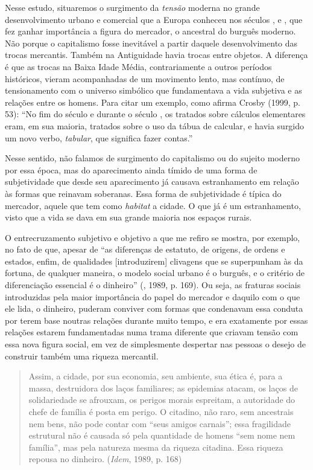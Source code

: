 Nesse estudo, situaremos o surgimento da \emph{tensão} moderna no grande
desenvolvimento urbano e comercial que a Europa conheceu nos séculos ,
 e , que fez ganhar importância a figura do mercador,
o ancestral do burguês moderno. Não porque o capitalismo fosse
inevitável a partir daquele desenvolvimento das trocas mercantis. Também
na Antiguidade havia trocas entre objetos. A diferença é que as trocas
na Baixa Idade Média, contrariamente a outros períodos
históricos, vieram acompanhadas de um movimento lento, mas contínuo, de
tensionamento com o universo simbólico que fundamentava a vida subjetiva
e as relações entre os homens. Para citar um exemplo, como afirma Crosby
(1999, p. 53): ``No fim do século  e durante o século , os tratados
sobre cálculos elementares eram, em sua maioria, tratados sobre o uso da
tábua de calcular, e havia surgido um novo verbo, \emph{tabular}, que
significa fazer contas.''

Nesse sentido, não falamos de surgimento do capitalismo ou do sujeito
moderno por essa época, mas do aparecimento ainda tímido de uma forma de
subjetividade que desde seu aparecimento já causava estranhamento em
relação às formas que reinavam soberanas. Essa forma de subjetividade é
típica do mercador, aquele que tem como \emph{habitat} a cidade.
O que já é um estranhamento, visto que a vida se dava em sua grande
maioria nos espaços rurais.

O entrecruzamento subjetivo e objetivo a que me refiro se mostra, por
exemplo, no fato de que, apesar de ``as diferenças de estatuto, de
origens, de ordens e estados, enfim, de qualidades [introduzirem]
clivagens que se superpunham às da fortuna, de qualquer maneira, o
modelo social urbano é o burguês, e o critério de diferenciação
essencial é o dinheiro'' (, 1989, p. 169). Ou
seja, as fraturas sociais introduzidas pela maior importância do papel
do mercador e daquilo com o que ele lida, o dinheiro, puderam conviver
com formas que condenavam essa conduta por terem base noutras relações
durante muito tempo, e era exatamente por essas relações estarem
fundamentadas numa trama diferente que criavam tensão com essa nova
figura social, em vez de simplesmente despertar nas pessoas o desejo de
construir também uma riqueza mercantil.

\begin{quote}
Assim, a cidade, por sua economia, seu ambiente, sua ética é, para a
massa, destruidora dos laços familiares; as epidemias atacam, os laços
de solidariedade se afrouxam, os perigos morais espreitam, a autoridade
do chefe de família é posta em perigo. O citadino, não raro, sem
ancestrais nem bens, não pode contar com ``seus amigos carnais''; essa
fragilidade estrutural não é causada só pela quantidade de homens ``sem
nome nem família'', mas pela natureza mesma da riqueza citadina. Essa
riqueza repousa no dinheiro. (\emph{Idem}, 1989, p. 168)
\end{quote}

